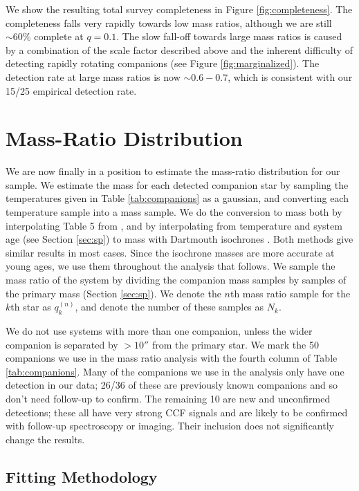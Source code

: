 \documentclass{emulateapj}
\begin{document}
We show the resulting total survey completeness in Figure \ref{fig:completeness}. The completeness falls very rapidly towards low mass ratios, although we are still $\sim 60\%$ complete at $q = 0.1$. The slow fall-off towards large mass ratios is caused by a combination of the scale factor described above and the inherent difficulty of detecting rapidly rotating companions (see Figure \ref{fig:marginalized}). The detection rate at large mass ratios is now $\sim 0.6-0.7$, which is consistent with our 15/25 empirical detection rate. 

\section{Mass-Ratio Distribution}
\label{sec:mrd}

We are now finally in a position to estimate the mass-ratio distribution for our sample. We estimate the mass for each detected companion star by sampling the temperatures given in Table \ref{tab:companions} as a gaussian, and converting each temperature sample into a mass sample. We do the conversion to mass both by interpolating Table 5 from \citet{Pecaut2013}, and by interpolating from temperature and system age (see Section \ref{sec:sp}) to mass with Dartmouth isochrones \citep{Dotter2008}. Both methods give similar results in most cases. Since the isochrone masses are more accurate at young ages, we use them throughout the analysis that follows. We sample the mass ratio of the system by dividing the companion mass samples by samples of the primary mass (Section \ref{sec:sp}). We denote the $n$th mass ratio sample for the $k$th star as $q_k^{(n)}$, and denote the number of these samples as $N_k$.

We do not use systems with more than one companion, unless the wider companion is separated by $ > 10''$ from the primary star. We mark the 50 companions we use in the mass ratio analysis with the fourth column of Table \ref{tab:companions}. Many of the companions we use in the analysis only have one detection in our data; 26/36 of these are previously known companions and so don't need follow-up to confirm. The remaining 10 are new and unconfirmed detections; these all have very strong CCF signals and are likely to be confirmed with follow-up spectroscopy or imaging. Their inclusion does not significantly change the results.


\subsection{Fitting  Methodology}
\end{document}
